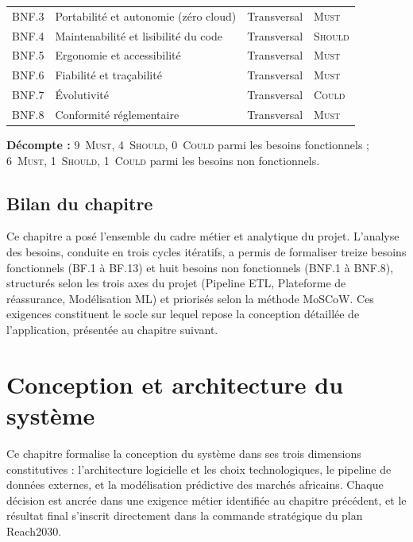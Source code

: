 \documentclass[12pt,a4paper]{report}
\begin{document}
\begin{table}[H]
\begin{tabularx}{\textwidth}{@{}p{1cm}Xp{1.8cm}p{1.4cm}@{}}
BNF.3 & Portabilité et autonomie (zéro cloud)             & Transversal & \textsc{Must} \\
BNF.4 & Maintenabilité et lisibilité du code              & Transversal & \textsc{Should} \\
BNF.5 & Ergonomie et accessibilité                        & Transversal & \textsc{Must} \\
BNF.6 & Fiabilité et traçabilité                          & Transversal & \textsc{Must} \\
BNF.7 & Évolutivité                                       & Transversal & \textsc{Could} \\
BNF.8 & Conformité réglementaire                          & Transversal & \textsc{Must} \\
\bottomrule
\end{tabularx}
\end{table}

\noindent\textbf{Décompte :} 9~\textsc{Must}, 4~\textsc{Should}, 0~\textsc{Could} parmi les besoins fonctionnels ; 6~\textsc{Must}, 1~\textsc{Should}, 1~\textsc{Could} parmi les besoins non fonctionnels.

\section{Bilan du chapitre}

Ce chapitre a posé l'ensemble du cadre métier et analytique du projet. L'analyse
des besoins, conduite en trois cycles itératifs, a permis de formaliser treize besoins
fonctionnels (BF.1 à BF.13) et huit besoins non fonctionnels (BNF.1 à BNF.8), structurés selon les trois axes du
projet (Pipeline ETL, Plateforme de réassurance, Modélisation ML) et priorisés
selon la méthode MoSCoW. Ces exigences constituent le socle sur lequel repose
la conception détaillée de l'application, présentée au chapitre suivant.
\clearpage

\chapter{Conception et architecture du système}
\label{chap:conception}

Ce chapitre formalise la conception du système dans ses trois dimensions constitutives : l'architecture logicielle et les choix technologiques, le pipeline de données externes, et la modélisation prédictive des marchés africains. Chaque décision est ancrée dans une exigence métier identifiée au chapitre précédent, et le résultat final s'inscrit directement dans la commande stratégique du plan Reach2030.
\end{document}
